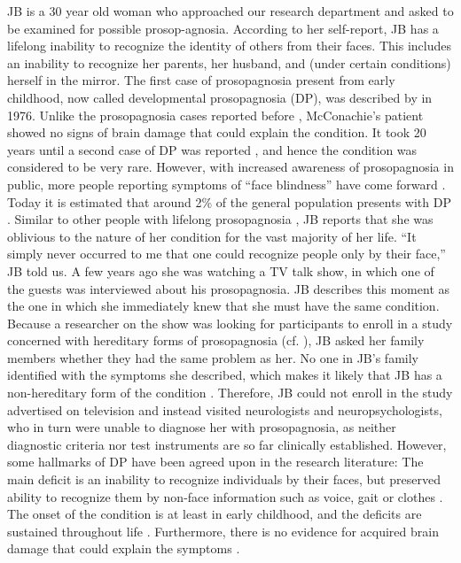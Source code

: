 \documentclass[fleqn,10pt]{SelfArx} %
\begin{document}
JB is a 30 year old woman who approached our research department and asked to be examined for possible prosop-agnosia. According to her self-report, JB has a lifelong inability to recognize the identity of others from their faces. This includes an inability to recognize her parents, her husband, and (under certain conditions) herself in the mirror.
The first case of prosopagnosia present from early childhood, now called developmental prosopagnosia (DP), was described by \citeauthor{McConachie_1976} in 1976. Unlike the prosopagnosia cases reported before \citep{Bodamer_1947, Benton_1968}, McConachie's patient showed no signs of brain damage that could explain the condition. It took 20 years until a second case of DP was reported \citep{Ariel_1996}, and hence the condition was considered to be very rare. However, with increased awareness of prosopagnosia in public, more people reporting symptoms of “face blindness” have come forward \citep{Duchaine_2006curr}. Today it is estimated that around 2\% of the general population presents with DP \citep{Kennerknecht_2008, Bowles_2009}. Similar to other people with lifelong prosopagnosia \citep{Sacks, Fine_2012}, JB reports that she was oblivious to the nature of her condition for the vast majority of her life. “It simply never occurred to me that one could recognize people only by their face,” JB told us. A few years ago she was watching a TV talk show, in which one of the guests was interviewed about his prosopagnosia. JB describes this moment as the one in which she immediately knew that she must have the same condition.
Because a researcher on the show was looking for participants to enroll in a study concerned with hereditary forms of prosopagnosia (cf. \citet{De_Haan_1999, GRUETER_2007}), JB asked her family members whether they had the same problem as her. No one in JB's family identified with the symptoms she described, which makes it likely that JB has a non-hereditary form of the condition \citep{Duchaine_2008, Bate_2009}. Therefore, JB could not enroll in the study advertised on television and instead visited neurologists and neuropsychologists, who in turn were unable to diagnose her with prosopagnosia, as neither diagnostic criteria \citep{Shah_2016, Bate_2017} nor test instruments \citep{Bowles_2009} are so far clinically established.
However, some hallmarks of DP have been agreed upon in the research literature: The main deficit is an inability to recognize individuals by their faces, but preserved ability to recognize them by non-face information such as voice, gait or clothes \citep{Rivolta_2012}. The onset of the condition is at least in early childhood, and the deficits are sustained throughout life \citep{Behrmann_2016}. Furthermore, there is no evidence for acquired brain damage that could explain the symptoms \citep{Susilo_2013}.
\end{document}
